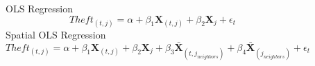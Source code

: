 \documentclass{article}
\begin{document}
\begin{figure}
\centering
OLS Regression
\[ Theft_{(t,j)} = \alpha + \beta_1 \bm{X}_{(t,j)} + \beta_2 \bm{X}_{j} + \epsilon_t \]
Spatial OLS Regression\\ 
\[ Theft_{(t,j)} = \alpha + \beta_1 \bm{X}_{(t,j)} + \beta_2 \bm{X}_j + \beta_3 \bm{\bar{X}}_{(t,{j_{neighbors}})} + \beta_4 \bm{\bar{X}}_{(j_{neighbors})} + \epsilon_t \]
\end{figure}
\end{document}
